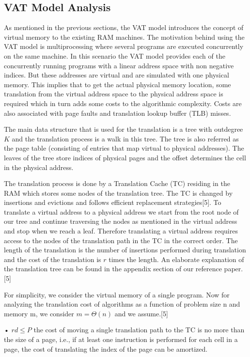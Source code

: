 \subsection{VAT Model Analysis}
As mentioned in the previous sections, the VAT model introduces the concept of
virtual memory to the existing RAM machines. The motivation behind using the
VAT model is multiprocessing where several programs are executed concurrently
on the same machine. In this scenario the VAT model provides each of the
concurrently running programs with a linear address space with non negative
indices. But these addresses are virtual and are simulated with one physical
memory. This implies that to get the actual physical memory location, some
translation from the virtual address space to the physical address space is
required which in turn adds some costs to the algorithmic complexity. Costs are
also associated with page faults and translation lookup buffer (TLB) misses.

The main data structure that is used for the translation is a tree with
outdegree $K$ and the translation process is a walk in this tree. The tree is
also referred as the page table (consisting of entries that map virtual to
physical addresses). The leaves of the tree store indices of physical pages and
the offset determines the cell in the physical address.

The translation process is done by a Translation Cache (TC) residing in the RAM
which stores some nodes of the translation tree. The TC is changed by
insertions and evictions and follows efficient replacement strategies[5]. To
translate a virtual address to a physical address we start from the root node
of our tree and continue traversing the nodes as mentioned in the virtual
address and stop when we reach a leaf. Therefore translating a virtual address
requires access to the nodes of the translation path in the TC in the correct
order. The length of the translation is the number of insertions performed
during translation and the cost of the translation is $r$ times the length. An
elaborate explanation of the translation tree can be found in the appendix
section of our reference paper.[5]

For simplicity, we consider the virtual memory of a single program. Now for
analyzing the translation cost of algorithms as a function of problem size n
and memory m, we consider $m = \Theta(n)$ and we assume.[5]

• $rd \leq P$ the cost of moving a single translation path to the TC is no more
than the size of a page, i.e., if at least one instruction is performed for
each cell in a page, the cost of translating the index of the page can be
amortized.

